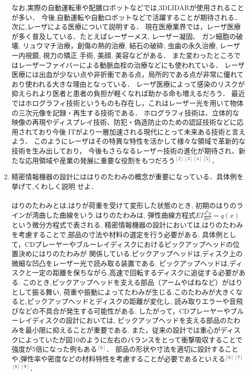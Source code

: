 \documentclass[a4paper,12pt]{jsarticle}
\begin{document}
\begin{enumerate}
なお,実際の自動運転車や配膳ロボットなどでは,3DLIDARが使用されることが多い．
今後,自動運転や自動ロボットなどで活躍することが期待される．
\quad 次に,レーザによる医療について説明する．
現在医療業界では，レーザ医療が多く普及している．たとえばレーザーメス, レーザー凝固、 ガン細胞の破壊, リュウマチ治療，創傷の熱的治療, 
結石の破砕, 虫歯の永久治療, レーザー内視鏡, 視力の矯正 手術, 美顔, 美容などがある．
 また変わったところではレーザーファイバーによる動脈血栓の治療などにも使われている．
 レーザ医療には出血が少ない点や非折衝である点，局所的である点が非常に優れており使われる大きな理由となっている．
レーザ医療によって感染のリスクが抑えられより医者と患者の負担が軽くなれば助かる命も増えるだろう．
\quad 最近ではホログラフィ技術というものも存在し，これはレーザー光を用いて物体の三次元像を記録・再生する技術である．
ホログラフィ技術は、立体的な映像の再現やディスプレイ技術、防犯・偽造防止のための認証技術などに応用されており今後
ITがより一層加速される現代にとって未来ある技術と言えよう．
このようにレーザはその特異な特性を活かして様々な領域で革新的な技術を生み出しており，
今後もさらなるレーザー技術の進化が期待され、新たな応用領域や産業の発展に重要な役割をもつだろう$^{[2]}$$^{[3]}$$^{[4]}$$^{[5]}$．
\\
\item 精密情報機器の設計にははりのたわみの概念が重要になっている．具体例を挙げて,くわしく説明
せよ．\\
\\
\quad はりのたわみとは,はりが荷重を受けて変形した状態のとき,
初期のはりのラインが湾曲した曲線をいう.はりのたわみは,
弾性曲線方程式$EI \frac{{d^4y}}{{dx^4}} = q(x)$
という微分方程式で表される.
精密情報機器の設計においては,はりのたわみを考慮することで,部品の寸法や材料の選定を行う必要がある.
具体例として，CDプレーヤーやブルーレイディスクにおけるピックアップヘッドの位置決めにはりのたわみが
関係している.ピックアップヘッドは,ディスク上の微細な凹凸をレーザー光で読み取る装置である.
ピックアップヘッドは,ディスクと一定の距離を保ちながら,高速で回転するディスクに追従する必要がある.
このとき,ピックアップヘッドを支える部品（アームやばねなど）がはりとして振る舞い,
荷重や振動によってたわみが生じる.このたわみが大きくなると,ピックアップヘッドとディスクの距離が変化し,
読み取りエラーや音飛びなどの不具合が発生する可能性がある.
したがって，CDプレーヤーやブルーレイディスクの設計においては,
ピックアップヘッドを支える部品のたわみを最小限に抑えることが重要である.
また，従来の設計では重心がディスクによっていたが図10のように左右のバランスをとって衝撃吸収することで
強度が5倍になった例もある$^{[6]}$．
部品の形状や寸法を適切に設計することや,弾性率や密度などの材料特性を考慮することが必要であるといえる$^{[6]}$$^{[7]}$$^{[8]}$$^{[9]}$．



\end{enumerate}
\end{document}
